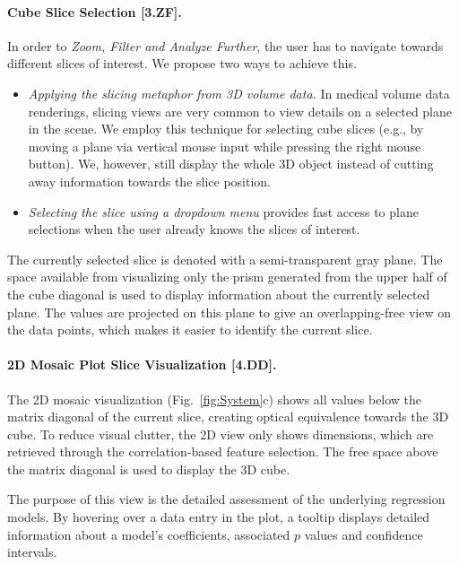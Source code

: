 \documentclass[journal]{style/vgtc} 			          %
\newcommand{\com}[1]{\textcolor{orange}{\uline{#1}}}
\begin{document}
\paragraph{Cube Slice Selection [3.ZF].}
In order to \emph{Zoom, Filter and Analyze Further}, the user has to navigate towards different slices of interest.
We propose two ways to achieve this.
\begin{itemize}
	\item \emph{Applying the slicing metaphor from 3D volume data.}
	In medical volume data renderings, slicing views are very common to view details on a selected plane in the scene.
	We employ this technique for selecting cube slices (e.g., by moving a plane via vertical mouse input while pressing the right mouse button).
	We, however, still display the whole 3D object instead of cutting away information towards the slice position.
	\item \emph{Selecting the slice using a dropdown menu} provides fast access to plane selections when the user already knows the slices of interest.
\end{itemize}
The currently selected slice is denoted with a semi-transparent gray plane.
The space available from visualizing only the prism generated from the upper half of the cube diagonal is used to display information about the currently selected plane.
The values are projected on this plane to give an overlapping-free view on the data points, which makes it easier to identify the current slice.
\paragraph{2D Mosaic Plot Slice Visualization [4.DD].}
The 2D mosaic visualization (Fig.~\ref{fig:System}c) shows all values below the matrix diagonal of the current slice, creating optical equivalence towards the 3D cube.
To reduce visual clutter, the 2D view only shows dimensions, which are retrieved through the correlation-based feature selection.
The free space above the matrix diagonal is used to display the 3D cube.

The purpose of this view is the detailed assessment of the underlying regression models.
By hovering over a data entry in the plot, a tooltip displays detailed information about a model's coefficients, associated $p$ values and confidence intervals.
\end{document}
